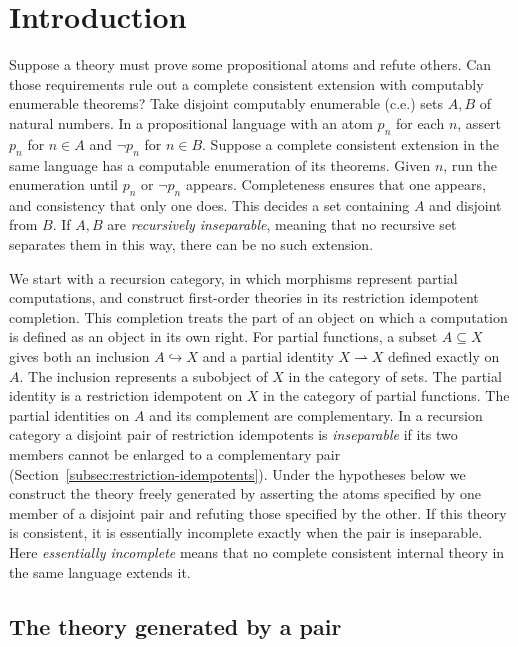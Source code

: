 \section{Introduction}

Suppose a theory must prove some propositional atoms and refute others.
Can those requirements rule out a complete consistent extension with
computably enumerable theorems?
Take disjoint computably enumerable (c.e.) sets $A,B$ of natural numbers.
In a propositional language with an atom $p_n$ for each $n$, assert
$p_n$ for $n\in A$ and $\neg p_n$ for $n\in B$.
Suppose a complete consistent extension in the same language has a
computable enumeration of its theorems. Given $n$, run the enumeration
until $p_n$ or $\neg p_n$ appears. Completeness ensures that one appears,
and consistency that only one does. This decides a set containing $A$
and disjoint from $B$. If $A,B$ are \emph{recursively inseparable},
meaning that no recursive set separates them in this way, there can
be no such extension.

We start with a recursion category, in which morphisms represent partial
computations, and construct first-order theories in its restriction
idempotent completion. This completion treats the part of an object on
which a computation is defined as an object in its own right. For partial functions, a subset $A\subseteq X$
gives both an inclusion $A\hookrightarrow X$ and a partial identity
$X\rightharpoonup X$ defined exactly on $A$. The inclusion represents
a subobject of $X$ in the category of sets. The partial identity is a
restriction idempotent on $X$ in the category of partial functions.
The partial identities on $A$ and its complement are complementary.
In a recursion category a disjoint pair of restriction idempotents is
\emph{inseparable} if its two members cannot be enlarged to a
complementary pair (Section~\ref{subsec:restriction-idempotents}).
Under the hypotheses below we construct the theory freely generated by
asserting the atoms specified by one member of a disjoint pair and
refuting those specified by the other. If this theory is consistent, it is essentially incomplete
exactly when the pair is inseparable. Here \emph{essentially incomplete} means
that no complete consistent internal theory in the same language extends it.

\subsection{The theory generated by a pair}

